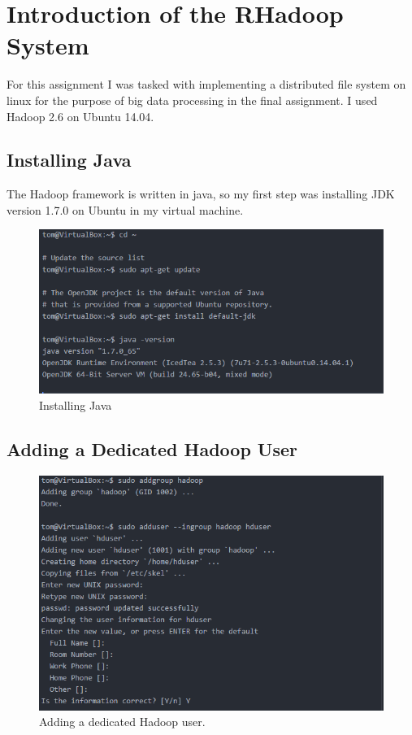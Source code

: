 \documentclass[12pt, letterpaper]{article}
\begin{document}
\section{Introduction of the RHadoop System}
For this assignment I was tasked with implementing a distributed file system on linux for the purpose of big data processing in the final assignment. I used Hadoop 2.6 on Ubuntu 14.04. 

\subsection{Installing Java}
The Hadoop framework is written in java, so my first step was installing JDK version 1.7.0 on Ubuntu in my virtual machine.

\begin{figure}[H]
\centering
\includegraphics[width=12cm]{RH1}
\caption{Installing Java}
\label{fig:ij}
\end{figure}

\subsection{Adding a Dedicated Hadoop User}

\begin{figure}[H]
\centering
\includegraphics[width=12cm]{RH2}
\caption{Adding a dedicated Hadoop user.}
\label{fig:ij}
\end{figure}
\end{document}
